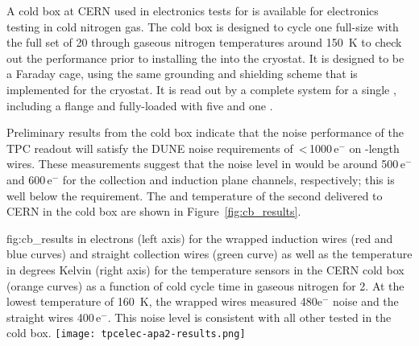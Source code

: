 A cold box at CERN used in electronics tests for  is available for electronics testing in cold nitrogen gas. The cold box is designed to cycle one full-size  with the full set of \num{20}  through gaseous nitrogen temperatures around \SI{150}{K} to check out the  performance prior to installing the  into the  cryostat. It is designed to be a Faraday cage, using the same grounding and shielding scheme that is implemented for the  cryostat. It is read out by a complete  system for a single , including a  flange and fully-loaded  with five  and one .

Preliminary results from the  cold box indicate that
the noise performance of the TPC readout will satisfy the DUNE  noise requirements of
\,<\,\num{1000}\,e$^-$ on -length wires. These measurements suggest that the noise level in
\lar would be around \num{500}\,e$^-$ and \num{600}\,e$^-$ for the collection and induction plane channels,
respectively; this is well below the requirement.  The  and temperature of the second 
 delivered to CERN in the cold box are shown in Figure~\ref{fig:cb_results}.

\begin{dunefigure}
{fig:cb_results}
{ in electrons (left axis) for the wrapped induction wires (red and blue curves) and 
straight collection wires (green curve) as well as the temperature in degrees Kelvin (right axis) for the temperature
sensors in the CERN cold box (orange curves) as a function of cold cycle time in gaseous nitrogen for  2. 
At the lowest temperature of \SI{160}{K}, the wrapped wires measured 480e$^-$ noise and the straight 
wires \num{400}\,e$^-$. This noise level is consistent with all other   tested in the cold box.}
\texttt{[image: tpcelec-apa2-results.png]}
\end{dunefigure}
